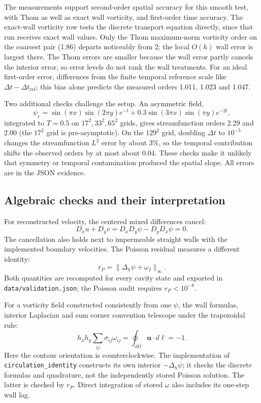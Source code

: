 \documentclass[11pt,a4paper]{article}
\newcommand{\dt}{\Delta t}
\newcommand{\code}[1]{\texttt{#1}}
\begin{document}
The measurements support second-order spatial accuracy for this smooth test,
with Thom as well as exact wall vorticity, and first-order time accuracy.
The exact-wall vorticity row tests the discrete transport equation directly,
since that run receives exact wall values. Only the Thom maximum-norm
vorticity order on the coarsest pair (1.86) departs noticeably from 2; the
local $O(h)$ wall error is largest there. The Thom errors are smaller because
the wall error partly cancels the interior error, so error levels do not rank
the wall treatments. For an ideal first-order error, differences from the
finite temporal reference scale like $\dt-\dt_{\mathrm{ref}}$; this bias alone
predicts the measured orders 1.011, 1.023 and 1.047.

Two additional checks challenge the setup. An asymmetric field,
\[
\psi_e=\sin(\pi x)\sin(2\pi y)e^{-t}+0.3\sin(3\pi x)\sin(\pi y)e^{-2t},
\]
integrated to $T=0.5$ on
$17^2,33^2,65^2$ grids, gives streamfunction orders 2.29 and 2.00 (the $17^2$
grid is pre-asymptotic). On the $129^2$ grid, doubling $\dt$ to $10^{-5}$
changes the streamfunction $L^2$ error by about 3\%, so the temporal
contribution shifts the observed orders by at most about 0.04. These checks
make it unlikely that symmetry or temporal contamination produced the
spatial slope. All errors are in the JSON evidence.

\subsection{Algebraic checks and their interpretation}
For reconstructed velocity, the centered mixed differences cancel:
\begin{equation}
D_xu+D_yv=D_xD_y\psi-D_yD_x\psi=0.
\end{equation}
The cancellation also holds next to impermeable straight walls with the
implemented boundary velocities. The Poisson residual measures a different
identity:
\begin{equation}
r_P=\|\Delta_h\psi+\omega_I\|_\infty.
\end{equation}
Both quantities are recomputed for every cavity state and exported in
\code{data/validation.json}; the Poisson audit requires $r_P<10^{-8}$.

For a vorticity field constructed consistently from one $\psi$, the wall
formulas, interior Laplacian and sum corner convention telescope under the
trapezoidal rule:
\begin{equation}
h_xh_y\sum_{ij}\sigma_{ij}\omega_{ij}
=\oint_{\partial\Omega}\mathbf{u}\cdot d\boldsymbol\ell=-1.
\end{equation}
Here the contour orientation is counterclockwise. The implementation of
\code{circulation\_identity} constructs its own interior $-\Delta_h\psi$;
it checks the discrete formulas and quadrature, not the independently stored
Poisson solution. The latter is checked by $r_P$. Direct integration of stored
$\omega$ also includes its one-step wall lag.
\end{document}
